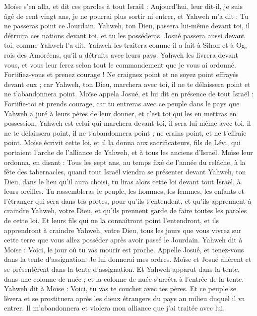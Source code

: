 \begin{multicols}{2}
\VerseOne{}Moïse s'en alla, et dit ces paroles à tout Israël :
Aujourd’hui, leur dit-il, je suis âgé de cent vingt ans, je ne pourrai plus sortir ni entrer, et Yahweh m'a dit : Tu ne passeras point ce Jourdain.
Yahweh, ton Dieu, passera lui-même devant toi, il détruira ces nations devant toi, et tu les posséderas. Josué passera aussi devant toi, comme Yahweh l’a dit.
Yahweh les traitera comme il a fait à Sihon et à Og, rois des Amoréens, qu’il a détruits avec leurs pays.
Yahweh les livrera devant vous, et vous leur ferez selon tout le commandement que je vous ai ordonné.
Fortifiez-vous et prenez courage ! Ne craignez point et ne soyez point effrayés devant eux ; car Yahweh, ton Dieu, marchera avec toi, il ne te délaissera point et ne t'abandonnera point.
Moïse appela Josué, et lui dit en présence de tout Israël : Fortifie-toi et prends courage, car tu entreras avec ce peuple dans le pays que Yahweh a juré à leurs pères de leur donner, et c'est toi qui les en mettras en possession.
Yahweh est celui qui marchera devant toi, il sera lui-même avec toi, il ne te délaissera point, il ne t'abandonnera point ; ne crains point, et ne t’effraie point.
Moïse écrivit cette loi, et il la donna aux sacrificateurs, fils de Lévi, qui portaient l'arche de l'alliance de Yahweh, et à tous les anciens d'Israël.
Moïse leur ordonna, en disant : Tous les sept ans, au temps fixé de l'année du relâche, à la fête des tabernacles,
quand tout Israël viendra se présenter devant Yahweh, ton Dieu, dans le lieu qu'il aura choisi, tu liras alors cette loi devant tout Israël, à leurs oreilles.
Tu rassembleras le peuple, les hommes, les femmes, les enfants et l’étranger qui sera dans tes portes, pour qu'ils t’entendent, et qu'ils apprennent à craindre Yahweh, votre Dieu, et qu'ils prennent garde de faire toutes les paroles de cette loi.
Et leurs fils qui ne la connaîtront point l'entendront, et ils apprendront à craindre Yahweh, votre Dieu, tous les jours que vous vivrez sur cette terre que vous allez posséder après avoir passé le Jourdain.
Yahweh dit à Moïse : Voici, le jour où tu vas mourir est proche. Appelle Josué, et tenez-vous dans la tente d’assignation. Je lui donnerai mes ordres. Moïse et Josué allèrent et se présentèrent dans la tente d’assignation.
Et Yahweh apparut dans la tente, dans une colonne de nuée ; et la colonne de nuée s'arrêta à l'entrée de la tente.
Yahweh dit à Moïse : Voici, tu vas te coucher avec tes pères. Et ce peuple se lèvera et se prostituera après les dieux étrangers du pays au milieu duquel il va entrer. Il m'abandonnera et violera mon alliance que j'ai traitée avec lui.

\end{multicols}
